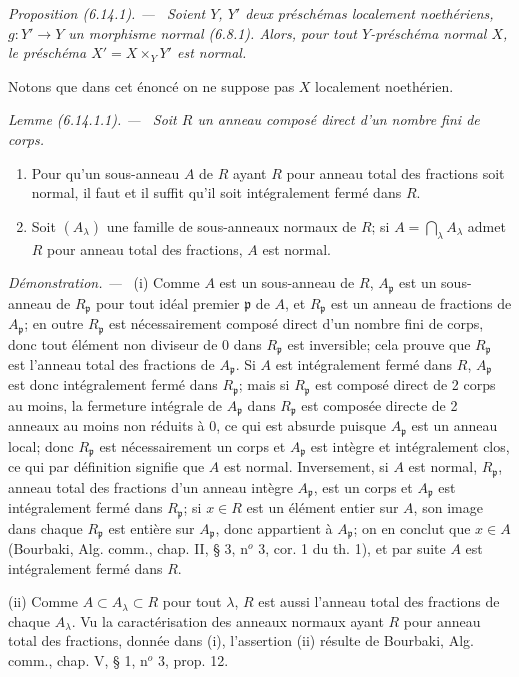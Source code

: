 \documentclass[10pt,oneside]{book}
\makeatletter
\newcommand{\oldpage}[2][]{%
  \setcounter{footnote}{0}%
  \marginpar{\scriptsize\textbf{#1}~|~#2}\ignorespaces}
\newenvironment{proposition}[1][]{%
  \par\medskip\noindent\itshape Proposition (#1). ---\ }{\par}
\newenvironment{lemma}[1][]{%
  \par\medskip\noindent\itshape Lemme (#1). ---\ }{\par}
\newenvironment{proof}{%
  \par\medskip\noindent\textit{Démonstration. ---\ }}{\par}
\newcommand{\EGAReaderTarget}[2]{\hypertarget{#1}{}\@bsphack\begingroup\def\@currentHref{#1}\label{#2}\endgroup\@esphack}
\makeatother
\begin{document}
\begin{proposition}[6.14.1]
\EGAReaderTarget{ega4.c04.prop.6-14-1}{IV.2.s6.14.1-fr}
Soient $Y$, $Y'$ deux préschémas localement noethériens,
$g:Y'\to Y$ un morphisme normal (6.8.1). Alors, pour tout $Y$-préschéma
normal $X$, le préschéma $X'=X\times_Y Y'$ est normal.
\end{proposition}

Notons que dans cet énoncé on ne suppose pas $X$ localement noethérien.

\begin{lemma}[6.14.1.1]
\label{IV.2.s6.14.1.1-fr}
Soit $R$ un anneau composé direct d'un nombre fini de corps.
\begin{enumerate}
\item[(i)] Pour qu'un sous-anneau $A$ de $R$ ayant $R$ pour anneau total
des fractions soit normal, il faut et il suffit qu'il soit intégralement
fermé dans $R$.
\item[(ii)] Soit $(A_\lambda)$ une famille de sous-anneaux normaux de $R$;
si $A=\bigcap_\lambda A_\lambda$ admet $R$ pour anneau total des fractions,
$A$ est normal.
\end{enumerate}
\end{lemma}

\begin{proof}
(i) Comme $A$ est un sous-anneau de $R$, $A_\mathfrak p$ est un sous-anneau
de $R_\mathfrak p$ pour tout idéal premier $\mathfrak p$ de $A$, et
$R_\mathfrak p$ est un anneau de fractions de $A_\mathfrak p$; en outre
$R_\mathfrak p$ est nécessairement composé direct d'un nombre fini de
corps, donc tout élément non diviseur de $0$ dans $R_\mathfrak p$ est
inversible; cela prouve que $R_\mathfrak p$ est l'anneau total des fractions
de $A_\mathfrak p$. Si $A$ est intégralement fermé dans $R$,
$A_\mathfrak p$ est donc intégralement fermé dans $R_\mathfrak p$; mais si
$R_\mathfrak p$ est composé direct de 2 corps au moins, la fermeture
intégrale de $A_\mathfrak p$ dans $R_\mathfrak p$ est composée directe de
2 anneaux au moins non réduits à $0$, ce qui est absurde puisque
$A_\mathfrak p$ est un anneau local; donc $R_\mathfrak p$ est
nécessairement un corps et $A_\mathfrak p$ est intègre et intégralement clos,
ce qui par définition signifie que $A$ est normal. Inversement, si $A$ est
normal, $R_\mathfrak p$, anneau total des fractions d'un anneau intègre
$A_\mathfrak p$, est un corps et $A_\mathfrak p$ est intégralement fermé
dans $R_\mathfrak p$; si $x\in R$ est un élément entier sur $A$, son image
dans chaque $R_\mathfrak p$ est entière sur $A_\mathfrak p$, donc appartient
à $A_\mathfrak p$; on en conclut que $x\in A$ (Bourbaki, Alg. comm., chap.
II, § 3, n$^o$ 3, cor. 1 du th. 1), et par suite $A$ est intégralement fermé
dans $R$.

\oldpage[IV-2]{170}
(ii) Comme $A\subset A_\lambda\subset R$ pour tout $\lambda$, $R$ est aussi
l'anneau total des fractions de chaque $A_\lambda$. Vu la caractérisation
des anneaux normaux ayant $R$ pour anneau total des fractions, donnée dans
(i), l'assertion (ii) résulte de Bourbaki, Alg. comm., chap. V, § 1, n$^o$
3, prop. 12.
\end{proof}
\end{document}
